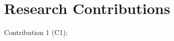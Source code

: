 \section{Research Contributions}\label{sec:intro_contributions}

\begin{contr}{Contribution 1 (C1):}
\end{contr}
